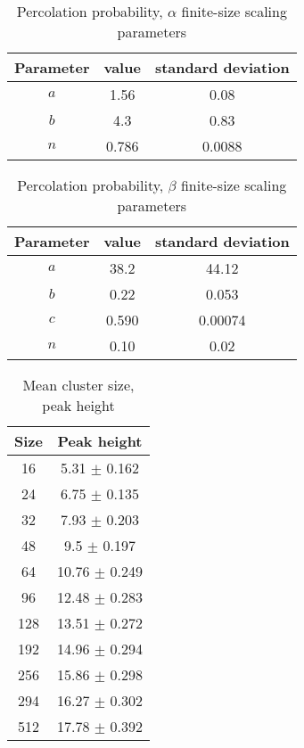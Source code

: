 \begin{table}[H]
\begin{center}
    \begin{tabular}{||c |c| c|| }
    \hline
      Parameter &  value & standard deviation \\
    \hline
      $a$ &    1.56  &  0.08 \\
      $b$ &    4.3 &  0.83 \\
      $n$ & 0.786 & 0.0088 \\
    \hline
    \end{tabular}
\end{center}
\caption{Percolation probability, $\alpha$ finite-size scaling parameters}
\label{table:pp_slope_finite_size_scaling_params}
\end{table}


\begin{table}[H]
\begin{center}
    \begin{tabular}{||c | c c|| }
    \hline
      Parameter &  value & standard deviation \\
    \hline
      $a$ &    38.2  &  44.12 \\
      $b$ &    0.22 &  0.053 \\
      $c$ & 0.590 & 0.00074 \\
      $n$ & 0.10 & 0.02 \\
    \hline
    \end{tabular}
\end{center}
\caption{Percolation probability, $\beta$ finite-size scaling parameters}
\label{table:pp_center_finite_size_scaling_params}
\end{table}






\begin{table}[H]
\begin{center}
    \begin{tabular}{||c | c|| }
    \hline
       Size & Peak height     \\
    \hline
         16 & 5.31 $\pm$ 0.162  \\
         24 & 6.75 $\pm$ 0.135  \\
         32 & 7.93 $\pm$ 0.203  \\
         48 & 9.5 $\pm$ 0.197   \\
         64 & 10.76 $\pm$ 0.249 \\
         96 & 12.48 $\pm$ 0.283 \\
        128 & 13.51 $\pm$ 0.272 \\
        192 & 14.96 $\pm$ 0.294 \\
        256 & 15.86 $\pm$ 0.298 \\
        294 & 16.27 $\pm$ 0.302 \\
        512 & 17.78 $\pm$ 0.392 \\
    \hline
    \end{tabular}
\end{center}
\caption{Mean cluster size, peak height}
\label{table:pp_mean_cluster_size_peak_values}
\end{table}



